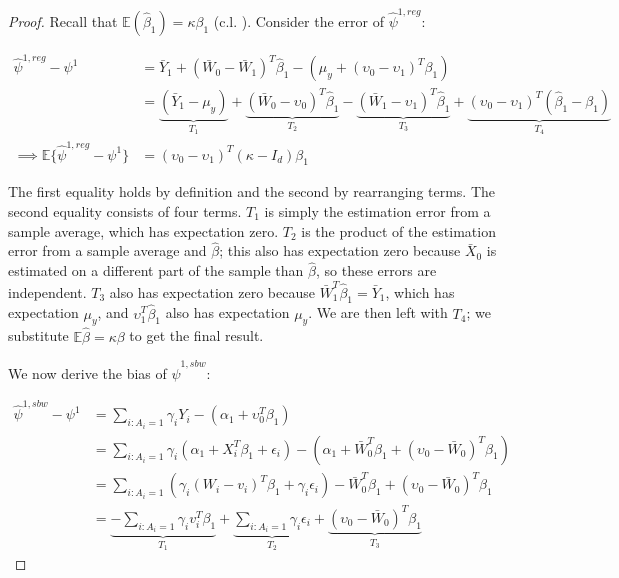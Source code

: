 \begin{proof}
Recall that $\mathbb{E}(\hat{\beta}_1) = \kappa\beta_1$ (c.l. \cite{gleser1992importance}). Consider the error of $\hat{\psi}^{1, reg}$: 

\begin{align*}
    \hat{\psi}^{1, reg} - \psi^1 &= \bar{Y}_1 + (\bar{W}_0 - \bar{W}_1)^T\hat{\beta}_1 - (\mu_y + (\upsilon_0 - \upsilon_1)^T\beta_1) \\
    &= \underbrace{(\bar{Y}_1 - \mu_y)}_{T_1} + \underbrace{(\bar{W}_0 - \upsilon_0)^T\hat{\beta}_1}_{T_2} - \underbrace{(\bar{W}_1 - \upsilon_1)^T\hat{\beta}_1}_{T_3} + \underbrace{(\upsilon_0 - \upsilon_1)^T(\hat{\beta}_1 - \beta_1)}_{T_4} \\
    \implies \mathbb{E}\{\hat{\psi}^{1, reg} - \psi^1\} &= (\upsilon_0 - \upsilon_1)^T(\kappa - I_d)\beta_1
\end{align*}

The first equality holds by definition and the second by rearranging terms. The second equality consists of four terms. $T_1$ is simply the estimation error from a sample average, which has expectation zero. $T_2$ is the product of the estimation error from a sample average and $\hat{\beta}$; this also has expectation zero because $\bar{X}_0$ is estimated on a different part of the sample than $\hat{\beta}$, so these errors are independent. $T_3$ also has expectation zero because $\bar{W}_1^T\hat{\beta}_1 = \bar{Y}_1$, which has expectation $\mu_y$, and $\upsilon_1^T\hat{\beta}_1$ also has expectation $\mu_y$. We are then left with $T_4$; we substitute $\mathbb{E}{\hat{\beta}} = \kappa\beta$ to get the final result. 

We now derive the bias of $\hat{\psi}^{1, sbw}$:

\begin{align*}
    \hat{\psi}^{1, sbw} - \psi^1 &= \sum_{i: A_i = 1}\gamma_iY_i - (\alpha_1 + \upsilon_0^T\beta_1) \\
    &= \sum_{i: A_i = 1} \gamma_i(\alpha_1 + X_i^T\beta_1 + \epsilon_i) - (\alpha_1 + \bar{W}_0^T\beta_1 + (\upsilon_0 - \bar{W}_0)^T\beta_1) \\
    &= \sum_{i: A_i = 1} (\gamma_i(W_i - v_i)^T\beta_1 + \gamma_i\epsilon_i) - \bar{W}_0^T\beta_1 + (\upsilon_0 - \bar{W}_0)^T\beta_1 \\
    &= \underbrace{-\sum_{i: A_i = 1}\gamma_iv_i^T\beta_1}_{T_1} + \underbrace{\sum_{i: A_i = 1}\gamma_i\epsilon_i}_{T_2}  + \underbrace{(\upsilon_0 - \bar{W}_0)^T\beta_1}_{T_3}
\end{align*}


\end{proof}
